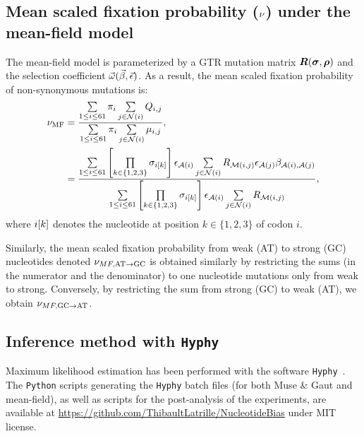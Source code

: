\subsection{Mean scaled fixation probability (\texorpdfstring{$\nu$}{ν}) under the mean-field model}
\label{sec:mut-bias-mean-field-omega}
The mean-field model is parameterized by a GTR mutation matrix $\bm{R}(\bm{\sigma}, \bm{\rho})$ and the selection coefficient $\vec{\omega}(\vec{\beta}, \vec{\epsilon})$.
As a result, the mean scaled fixation probability of non-synonymous mutations is:
\begin{align}
    \nu_{\text{MF}} & = \dfrac{ \sum\limits_{1 \leq {i} \leq 61} \pi_{{i}} \sum\limits_{{j} \in \mathcal{N}\left({i}\right)} Q_{{i}, {j}}}{ \sum\limits_{1 \leq {i} \leq 61} \pi_{{i}} \sum\limits_{{j} \in \mathcal{N}\left({i}\right)} \mu_{{i}, {j}}}, \\
    & = \dfrac{ \sum\limits_{1 \leq {i} \leq 61} \left[\prod\limits_{k \in \{ 1, 2, 3 \}} \sigma_{{i}[k]}\right] \epsilon_{\mathcal{A}({i})} \sum\limits_{{j} \in \mathcal{N}\left({i}\right)} R_{\mathcal{M}({i}, {j})} \epsilon_{\mathcal{A}({j})} \beta_{\mathcal{A}({i}), \mathcal{A}({j})} }{\sum\limits_{1 \leq {i} \leq 61} \left[\prod\limits_{k \in \{ 1, 2, 3 \}} \sigma_{{i}[k]}\right] \epsilon_{\mathcal{A}({i})} \sum\limits_{{j} \in \mathcal{N}\left({i}\right)} R_{\mathcal{M}({i}, {j})}},
\end{align}
where ${i}[k]$ denotes the nucleotide at position $k \in \{ 1, 2, 3 \}$ of codon $i$.

Similarly, the mean scaled fixation probability from weak (AT) to strong (GC) nucleotides denoted $\nu_{MF, \text{AT} \rightarrow \text{GC}}$ is obtained similarly by restricting the sums (in the numerator and the denominator) to one nucleotide mutations only from weak to strong.
Conversely, by restricting the sum from strong (GC) to weak (AT), we obtain $\nu_{MF, \text{GC} \rightarrow \text{AT}}$.

\subsection{Inference method with \texttt{Hyphy}}
\label{subsec:inference-method-with-hyphy}

Maximum likelihood estimation has been performed with the software \texttt{Hyphy}~\citep{Pond2005}.
The \texttt{Python} scripts generating the \texttt{Hyphy} batch files (for both Muse \& Gaut and mean-field), as well as scripts for the post-analysis of the experiments, are available at \url{https://github.com/ThibaultLatrille/NucleotideBias} under MIT license.
